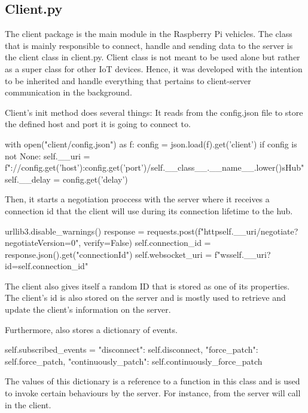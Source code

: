 \subsection{Client.py}
The client package is the main module in the Raspberry Pi vehicles. The class that is mainly responsible to connect, handle and sending data to the server is the client class in client.py. Client class is not meant to be used alone but rather as a super class for other IoT devices. Hence, it was developed with the intention to be inherited and handle everything that pertains to client-server communication in the background.

Client's init method does several things: It reads from the config.json file to store the defined host and port it is going to connect to.
\begin{python}
with open("client/config.json") as f:
	config = json.load(f).get('client')
	if config is not None:
	self.__uri = f"://{config.get('host')}:{config.get('port')}/{self.__class__.__name__.lower()}sHub"
	self.__delay = config.get('delay')
\end{python}

Then, it starts a negotiation proccess with the server where it receives a connection id that the client will use during its connection lifetime to the hub.

\begin{python}
urllib3.disable_warnings()
response = requests.post(f"http{self.__uri}/negotiate?negotiateVersion=0", verify=False)
self.connection_id = response.json().get("connectionId")
self.websocket_uri = f"ws{self.__uri}?id={self.connection_id}"
\end{python}

The client also gives itself a random ID that is stored as one of its properties. The client's id is also stored on the server and is mostly used to retrieve and update the client's information on the server.

Furthermore,  also stores a dictionary of events.
\begin{python}
self.subscribed_events = {
	"disconnect": self.disconnect,
	"force_patch": self.force_patch,
	"continuously_patch": self.continuously_force_patch
}
\end{python}

The values of this dictionary is a reference to a function in this class and is used to invoke certain behaviours by the server. For instance,  from the server will call  in the client. 